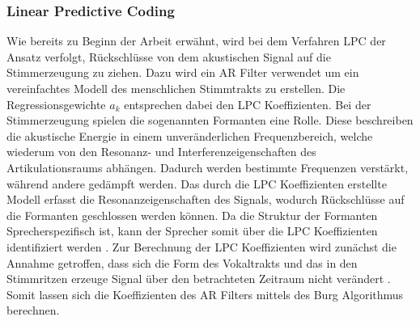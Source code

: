 \subsubsection{Linear Predictive Coding}
Wie bereits zu Beginn der Arbeit erwähnt, wird bei dem Verfahren \ac{LPC} der Ansatz verfolgt, Rückschlüsse von dem akustischen Signal auf die Stimmerzeugung zu ziehen.
Dazu wird ein \ac{AR} Filter verwendet um ein vereinfachtes Modell des menschlichen Stimmtrakts zu erstellen.
Die Regressionsgewichte $a_k$ entsprechen dabei den \ac{LPC} Koeffizienten.
\newline
\newline
Bei der Stimmerzeugung spielen die sogenannten Formanten eine Rolle.
Diese beschreiben die akustische Energie in einem unveränderlichen Frequenzbereich, welche wiederum von den Resonanz- und Interferenzeigenschaften des Artikulationsraums abhängen.
Dadurch werden bestimmte Frequenzen verstärkt, während andere gedämpft werden.
Das durch die \ac{LPC} Koeffizienten erstellte Modell erfasst die Resonanzeigenschaften des Signals, wodurch Rückschlüsse auf die Formanten geschlossen werden können.
Da die Struktur der Formanten Sprecherspezifisch ist, kann der Sprecher somit über die \ac{LPC} Koeffizienten identifiziert werden \autocite[vgl.][S. 117]{sidorov_text-independent_2010}.
\newline
\newline
Zur Berechnung der \ac{LPC} Koeffizienten wird zunächst die Annahme getroffen, dass sich die Form des Vokaltrakts und das in den Stimmritzen erzeuge Signal über den betrachteten Zeitraum nicht verändert \autocite[vgl.][S. 1304]{atal_effectiveness_1974}.
Somit lassen sich die Koeffizienten des \ac{AR} Filters mittels des Burg Algorithmus berechnen.


